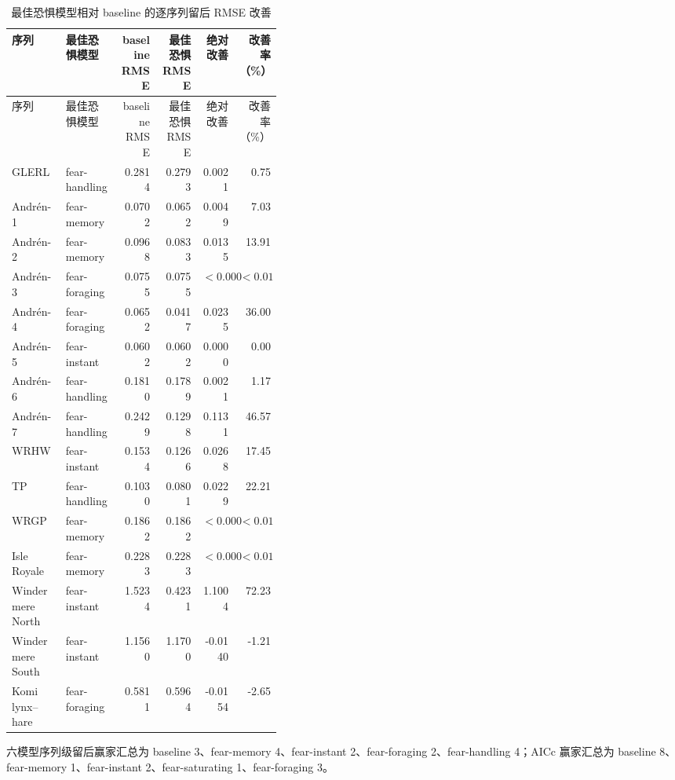 \documentclass[12pt,a4paper]{ctexart}
\begin{document}
\begin{landscape}
\begin{longtable}{p{0.20\linewidth}p{0.20\linewidth}rrrr}
 \caption{最佳恐惧模型相对 baseline 的逐序列留后 RMSE 改善}\label{tab:six-model-improvement}\\
 \toprule
 序列 & 最佳恐惧模型 & baseline RMSE & 最佳恐惧 RMSE & 绝对改善 & 改善率（\%）\\
 \midrule
 \endfirsthead
 \toprule
 序列 & 最佳恐惧模型 & baseline RMSE & 最佳恐惧 RMSE & 绝对改善 & 改善率（\%）\\
 \midrule
 \endhead
 GLERL & fear-handling & 0.2814 & 0.2793 & 0.0021 & 0.75\\
 Andrén-1 & fear-memory & 0.0702 & 0.0652 & 0.0049 & 7.03\\
 Andrén-2 & fear-memory & 0.0968 & 0.0833 & 0.0135 & 13.91\\
Andrén-3 & fear-foraging & 0.0755 & 0.0755 & $<0.0001$ & $<0.01$\\
 Andrén-4 & fear-foraging & 0.0652 & 0.0417 & 0.0235 & 36.00\\
 Andrén-5 & fear-instant & 0.0602 & 0.0602 & 0.0000 & 0.00\\
 Andrén-6 & fear-handling & 0.1810 & 0.1789 & 0.0021 & 1.17\\
 Andrén-7 & fear-handling & 0.2429 & 0.1298 & 0.1131 & 46.57\\
 WRHW & fear-instant & 0.1534 & 0.1266 & 0.0268 & 17.45\\
 TP & fear-handling & 0.1030 & 0.0801 & 0.0229 & 22.21\\
WRGP & fear-memory & 0.1862 & 0.1862 & $<0.0001$ & $<0.01$\\
Isle Royale & fear-memory & 0.2283 & 0.2283 & $<0.0001$ & $<0.01$\\
 Windermere North & fear-instant & 1.5234 & 0.4231 & 1.1004 & 72.23\\
 Windermere South & fear-instant & 1.1560 & 1.1700 & -0.0140 & -1.21\\
 Komi lynx--hare & fear-foraging & 0.5811 & 0.5964 & -0.0154 & -2.65\\
 \bottomrule
\end{longtable}
\end{landscape}

六模型序列级留后赢家汇总为 baseline 3、fear-memory 4、fear-instant 2、fear-foraging 2、fear-handling 4；AICc 赢家汇总为 baseline 8、fear-memory 1、fear-instant 2、fear-saturating 1、fear-foraging 3。
\end{document}
